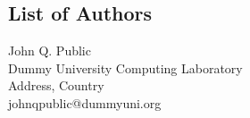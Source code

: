 \documentclass[a4paper,UKenglish]{lipicsmaster-v2016}
\begin{document}
\begin{participants}
\chapter[Authors]{List of Authors}
\participant John Q. Public\\ 
  Dummy University Computing Laboratory\\
  Address, Country\\
  johnqpublic@dummyuni.org

\end{participants} 
\end{document}
